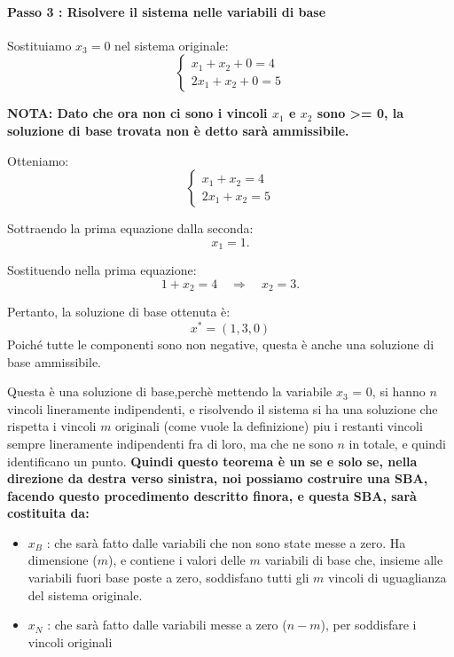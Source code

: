 \paragraph{Passo 3 : Risolvere il sistema nelle variabili di base}
Sostituiamo \(x_3=0\) nel sistema originale:
\[
\begin{cases}
x_1+x_2+0=4\\
2x_1+x_2+0=5
\end{cases}
\]

\textbf{NOTA: Dato che ora non ci sono i vincoli $x_1$ e $x_2$ sono >= 0, la soluzione di base trovata non è detto sarà ammissibile.}

Otteniamo:
\[
\begin{cases}
x_1+x_2=4\\
2x_1+x_2=5
\end{cases}
\]

Sottraendo la prima equazione dalla seconda:
\[
x_1=1.
\]

Sostituendo nella prima equazione:
\[
1+x_2=4
\quad\Longrightarrow\quad x_2=3.
\]

Pertanto, la soluzione di base ottenuta è:
\[
\boxed{x^*=(1,3,0)}
\]
Poiché tutte le componenti sono non negative, questa è anche una soluzione di base ammissibile.
\begin{center}
    Questa è una soluzione di base,perchè mettendo la variabile $x_3$ = 0, si hanno $n$ vincoli lineramente indipendenti, e risolvendo il sistema si ha una soluzione che rispetta i vincoli $m$ originali (come vuole la definizione)
    piu i restanti vincoli sempre lineramente indipendenti fra di loro, ma che ne sono $n$ in totale, e quindi identificano un punto.
    \textbf{Quindi questo teorema è un se e solo se, nella direzione da destra verso sinistra, noi possiamo costruire una SBA, facendo questo procedimento descritto finora, e questa SBA, sarà costituita da:}
    \begin{itemize}
        \item \textbf{$x_B$} : che sarà fatto dalle variabili che non sono state messe a zero. Ha dimensione ($m$), e contiene i valori delle \(m\) variabili di base che, insieme alle variabili fuori base poste a zero, soddisfano tutti gli \(m\) vincoli di uguaglianza del sistema originale.
        \item \textbf{$x_N$} : che sarà fatto dalle variabili messe a zero ($n-m$), per soddisfare i vincoli originali
    \end{itemize}
\end{center}



